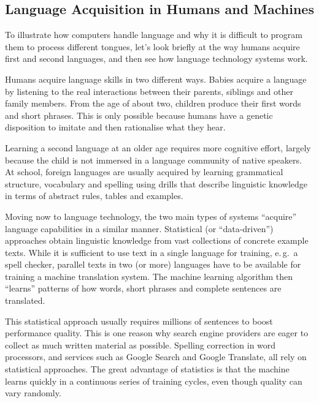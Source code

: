 \begin{multicols}{2}
\subsection{Language Acquisition in Humans and Machines}

To illustrate how computers handle language and why it is difficult to program them to process different tongues, let’s look briefly at the way humans acquire first and second languages, and then see how language technology systems work.

Humans acquire language skills in two different ways. Babies acquire a language by listening to the real interactions between their parents, siblings and other family members. From the age of about two, children produce their first words and short phrases. This is only possible because humans have a genetic disposition to imitate and then rationalise what they hear. 

Learning a second language at an older age requires more cognitive effort, largely because the child is not immersed in a language community of native speakers. At school, foreign languages are usually acquired by learning grammatical structure, vocabulary and spelling using drills that describe linguistic knowledge in terms of abstract rules, tables and examples.


Moving now to language technology, the two main types of systems
``acquire'' language capabilities in a similar manner. Statistical (or
``data-driven'') approaches obtain linguistic knowledge from vast
collections of concrete example texts. While it is sufficient to use
text in a single language for training, e.\,g.~a spell checker,
parallel texts in two (or more) languages have to be available for
training a machine translation system. The machine learning algorithm
then “learns” patterns of how words, short phrases and complete
sentences are translated.

This statistical approach usually requires millions of sentences to boost performance quality. This is one reason why search engine providers are eager to collect as much written material as possible. Spelling correction in word processors, and services such as Google Search and Google Translate, all rely on statistical approaches. The great advantage of statistics is that the machine learns quickly in a continuous series of training cycles, even though quality can vary randomly.


\end{multicols}
